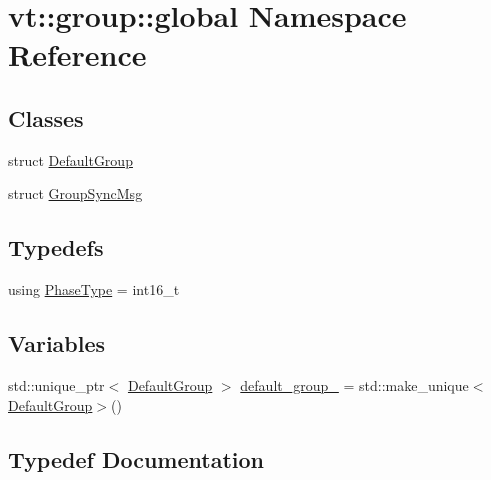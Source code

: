 \hypertarget{namespacevt_1_1group_1_1global}{}\section{vt\+:\+:group\+:\+:global Namespace Reference}
\label{namespacevt_1_1group_1_1global}
\subsection*{Classes}
\begin{DoxyCompactItemize}
\item 
struct \hyperlink{structvt_1_1group_1_1global_1_1_default_group}{Default\+Group}
\item 
struct \hyperlink{structvt_1_1group_1_1global_1_1_group_sync_msg}{Group\+Sync\+Msg}
\end{DoxyCompactItemize}
\subsection*{Typedefs}
\begin{DoxyCompactItemize}
\item 
using \hyperlink{namespacevt_1_1group_1_1global_a1ad2576a1029e469969bdcd577122ee3}{Phase\+Type} = int16\+\_\+t
\end{DoxyCompactItemize}
\subsection*{Variables}
\begin{DoxyCompactItemize}
\item 
std\+::unique\+\_\+ptr$<$ \hyperlink{structvt_1_1group_1_1global_1_1_default_group}{Default\+Group} $>$ \hyperlink{namespacevt_1_1group_1_1global_a7b35a98031034bd9b2f6837a6b089c39}{default\+\_\+group\+\_\+} = std\+::make\+\_\+unique$<$\hyperlink{structvt_1_1group_1_1global_1_1_default_group}{Default\+Group}$>$()
\end{DoxyCompactItemize}


\subsection{Typedef Documentation}
\mbox{\label{namespacevt_1_1group_1_1global_a1ad2576a1029e469969bdcd577122ee3}} 
